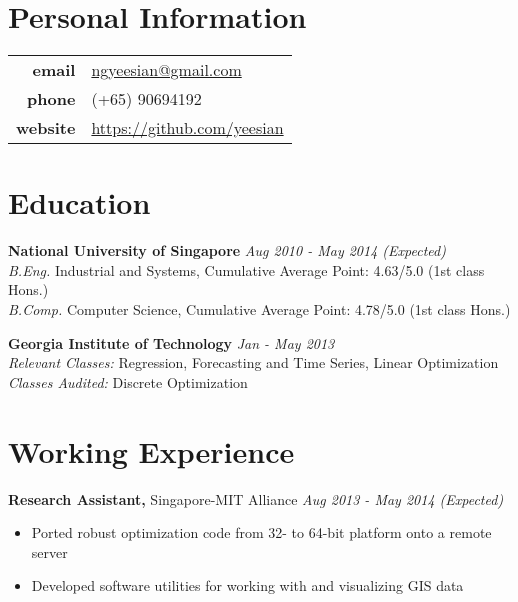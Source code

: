 \documentclass[margin]{res}
\begin{document}
 
\begin{resume}
 

\section{Personal Information}
\begin{tabular}{r l}
{\bf email} & \href{mailto:ngyeesian@gmail.com}{ngyeesian@gmail.com} \\
{\bf phone} & (+65) 90694192 \\
{\bf website} & \url{https://github.com/yeesian} \\
\end{tabular}

\section{Education} 
{\bf National University of Singapore}  \hfill \textit{Aug 2010 - May 2014 (Expected)} \\
\textit{B.Eng.} Industrial and Systems, Cumulative Average Point: 4.63/5.0 (1st class Hons.) \\
\textit{B.Comp.} Computer Science, Cumulative Average Point: 4.78/5.0 (1st class Hons.)

{\bf Georgia Institute of Technology}  \hfill \textit{Jan - May 2013}\\
\textit{Relevant Classes:} Regression, Forecasting and Time Series, Linear Optimization \\
\textit{Classes Audited:} Discrete Optimization

\section{Working Experience}
{\bf Research Assistant,} Singapore-MIT Alliance \hfill \textit{Aug 2013 - May 2014 (Expected)}
\begin{itemize} \itemsep -2pt  %
\item Ported robust optimization code from 32- to 64-bit platform onto a remote server
\item Developed software utilities for working with and visualizing GIS data
\end{itemize}
 

\end{resume}
\end{document}
